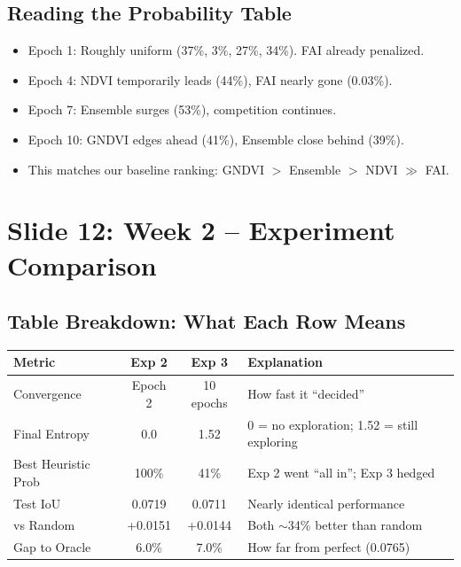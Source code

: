 \documentclass[11pt]{article}
\newenvironment{talkingpoints}{%
  \begin{itemize}[leftmargin=1.5em, itemsep=0.3em]
}{%
  \end{itemize}
}
\begin{document}
\subsection{Reading the Probability Table}

\begin{talkingpoints}
  \item Epoch 1: Roughly uniform (37\%, 3\%, 27\%, 34\%). FAI already penalized.
  \item Epoch 4: NDVI temporarily leads (44\%), FAI nearly gone (0.03\%).
  \item Epoch 7: Ensemble surges (53\%), competition continues.
  \item Epoch 10: GNDVI edges ahead (41\%), Ensemble close behind (39\%).
  \item This matches our baseline ranking: GNDVI $>$ Ensemble $>$ NDVI $\gg$ FAI.
\end{talkingpoints}

\section{Slide 12: Week 2 -- Experiment Comparison}

\subsection{Table Breakdown: What Each Row Means}

\begin{center}
\small
\begin{tabular}{lccl}
\toprule
\textbf{Metric} & \textbf{Exp 2} & \textbf{Exp 3} & \textbf{Explanation} \\
\midrule
Convergence & Epoch 2 & 10 epochs & How fast it ``decided'' \\
Final Entropy & 0.0 & 1.52 & 0 = no exploration; 1.52 = still exploring \\
Best Heuristic Prob & 100\% & 41\% & Exp 2 went ``all in''; Exp 3 hedged \\
Test IoU & 0.0719 & 0.0711 & Nearly identical performance \\
vs Random & +0.0151 & +0.0144 & Both $\sim$34\% better than random \\
Gap to Oracle & 6.0\% & 7.0\% & How far from perfect (0.0765) \\
\bottomrule
\end{tabular}
\end{center}
\end{document}
